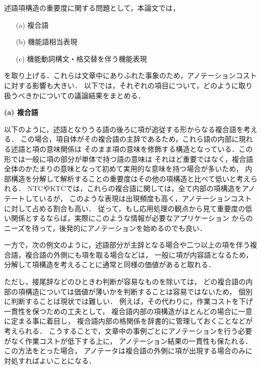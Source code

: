 \documentclass[japanese]{jnlp_1.4}
\begin{document}
述語項構造の重要度に関する問題として，本論文では，
\begin{enumerate}
\item[(a)] 複合語
\item[(b)] 機能語相当表現
\item[(c)] 機能動詞構文・格交替を伴う機能表現
\end{enumerate}
を取り上げる．これらは文章中にありふれた事象のため，アノテーションコストに対する影響も大きい．
以下では，それぞれの項目について，どのように取り扱うべきかについての議論結果をまとめる．

\noindent
{\bf (a) 複合語}

以下のように，述語となりうる語の後ろに項が追従する形からなる複合語を考える．
この場合，項自体がその複合語の主辞であるため，これら語の内部に現れる述語と項の意味関係は
そのまま項の意味を修飾する構造となっている．この形では一般に項の部分が単体で持つ語の意味は
それほど重要ではなく，複合語全体のかたまりの意味となって初めて実用的な意味を持つ場合が多いため，
内部構造を分解して解析することの重要度はその他の項構造と比べて低いと考えられる．
NTCやKTCでは，これらの複合語に関しては，全て内部の項構造をアノテートしているが，
このような表現は出現頻度も高く，アノテーションコストに対して占める割合も高い．
従って，もし応用処理の観点から見て重要度の低い関係とするならば，実際にこのような情報が必要なアプリケーション
からのニーズを待って，後発的にアノテーションを始めるのでも良い．

一方で，次の例文のように，述語部分が主辞となる場合や二つ以上の項を伴う複合語，複合語の外側にも項を取る場合などは，
一般に項が内容語となるため，分解して項構造を考えることに通常と同様の価値があると取れる．

ただし，接尾辞などのひときわ判断が容易なものを除いては，
どの複合語の内部の項構造については価値が薄いかを判断することは容易ではないため，
個別に判断することは現状では難しい．
例えば，その代わりに，作業コストを下げ一貫性を保つための工夫として，
複合語内部の項構造がほとんどの場合に一意に定まる事に着目し，
複合語内部の格関係を辞書的に管理しておくことなどが考えられる．
こうすることで，文章中の事例ごとにアノテーションを行う必要がなく作業コストが低下する上に，
アノテーション結果の一貫性も保たれる．
この方法をとった場合，
アノテータは複合語の外側に項が出現する場合のみに対処すればよいことになる．
\end{document}
